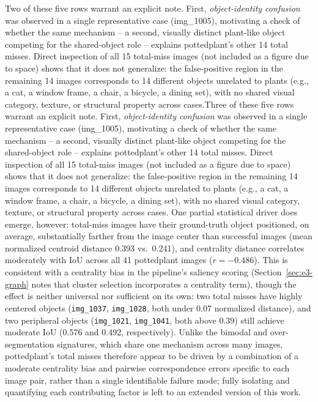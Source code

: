 Two of these five rows warrant an explicit note. First, \emph{object-identity confusion} was observed in a single representative case (img\_1005), motivating a check of whether the same mechanism -- a second, visually distinct plant-like object competing for the shared-object role -- explains pottedplant's other 14 total misses. Direct inspection of all 15 total-miss images (not included as a figure due to space) shows that it does not generalize: the false-positive region in the remaining 14 images corresponds to 14 different objects unrelated to plants (e.g., a cat, a window frame, a chair, a bicycle, a dining set), with no shared visual category, texture, or structural property across cases.Three of these five rows warrant an explicit note. First, \emph{object-identity confusion} was observed in a single representative case (img\_1005), motivating a check of whether the same mechanism -- a second, visually distinct plant-like object competing for the shared-object role -- explains pottedplant's other 14 total misses. Direct inspection of all 15 total-miss images (not included as a figure due to space) shows that it does not generalize: the false-positive region in the remaining 14 images corresponds to 14 different objects unrelated to plants (e.g., a cat, a window frame, a chair, a bicycle, a dining set), with no shared visual category, texture, or structural property across cases. One partial statistical driver does emerge, however: total-miss images have their ground-truth object positioned, on average, substantially farther from the image center than successful images (mean normalized centroid distance 0.393 vs.\ 0.241), and centrality distance correlates moderately with IoU across all 41 pottedplant images ($r=-0.486$). This is consistent with a centrality bias in the pipeline's saliency scoring (Section~\ref{sec:e3-graph} notes that cluster selection incorporates a centrality term), though the effect is neither universal nor sufficient on its own: two total misses have highly centered objects (\texttt{img\_1037}, \texttt{img\_1028}, both under 0.07 normalized distance), and two peripheral objects (\texttt{img\_1021}, \texttt{img\_1041}, both above 0.39) still achieve moderate IoU (0.576 and 0.492, respectively). Unlike the bimodal and over-segmentation signatures, which share one mechanism across many images, pottedplant's total misses therefore appear to be driven by a combination of a moderate centrality bias and pairwise correspondence errors specific to each image pair, rather than a single identifiable failure mode; fully isolating and quantifying each contributing factor is left to an extended version of this work.

